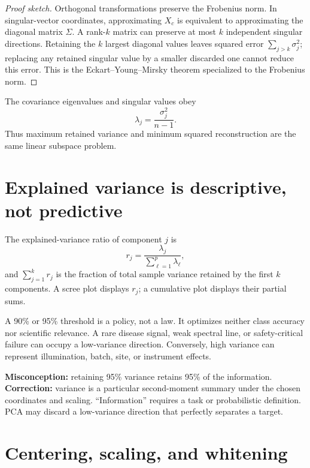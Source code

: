 \begin{proof}[Proof sketch]
Orthogonal transformations preserve the Frobenius norm. In singular-vector
coordinates, approximating $X_c$ is equivalent to approximating the diagonal
matrix $\Sigma$. A rank-$k$ matrix can preserve at most $k$ independent singular
directions. Retaining the $k$ largest diagonal values leaves squared error
$\sum_{j>k}\sigma_j^2$; replacing any retained singular value by a smaller
discarded one cannot reduce this error. This is the Eckart--Young--Mirsky
theorem specialized to the Frobenius norm.
\end{proof}

The covariance eigenvalues and singular values obey
\[
\lambda_j=\frac{\sigma_j^2}{n-1}.
\]
Thus maximum retained variance and minimum squared reconstruction are the same
linear subspace problem.

\section{Explained variance is descriptive, not predictive}

The explained-variance ratio of component $j$ is
\[
r_j=\frac{\lambda_j}{\sum_{\ell=1}^{p}\lambda_\ell},
\]
and $\sum_{j=1}^k r_j$ is the fraction of total sample variance retained by the
first $k$ components. A scree plot displays $r_j$; a cumulative plot displays
their partial sums.

A 90\% or 95\% threshold is a policy, not a law. It optimizes neither class
accuracy nor scientific relevance. A rare disease signal, weak spectral line,
or safety-critical failure can occupy a low-variance direction. Conversely,
high variance can represent illumination, batch, site, or instrument effects.

\begin{misconceptionbox}
\textbf{Misconception:} retaining 95\% variance retains 95\% of the information.
\textbf{Correction:} variance is a particular second-moment summary under the
chosen coordinates and scaling. ``Information'' requires a task or probabilistic
definition. PCA may discard a low-variance direction that perfectly separates a
target.
\end{misconceptionbox}


\section{Centering, scaling, and whitening}


